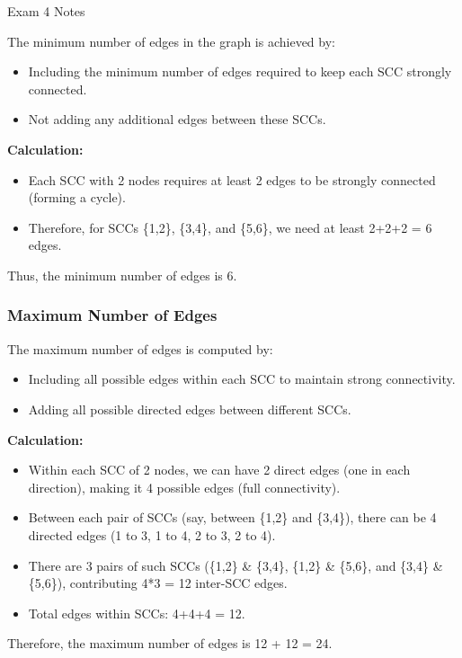 \begin{examnotes}{Exam 4 Notes}
\begin{highlight}
        The minimum number of edges in the graph is achieved by:
        \begin{itemize}
            \item Including the minimum number of edges required to keep each SCC strongly connected.
            \item Not adding any additional edges between these SCCs.
        \end{itemize}
        
        \textbf{Calculation:}
        \begin{itemize}
            \item Each SCC with 2 nodes requires at least 2 edges to be strongly connected (forming a cycle).
            \item Therefore, for SCCs \{1,2\}, \{3,4\}, and \{5,6\}, we need at least 2+2+2 = 6 edges.
        \end{itemize}
        
        Thus, the minimum number of edges is 6.
        
        \subsubsection*{Maximum Number of Edges}
        
        The maximum number of edges is computed by:
        \begin{itemize}
            \item Including all possible edges within each SCC to maintain strong connectivity.
            \item Adding all possible directed edges between different SCCs.
        \end{itemize}
        
        \textbf{Calculation:}
        \begin{itemize}
            \item Within each SCC of 2 nodes, we can have 2 direct edges (one in each direction), making it 4 possible edges (full connectivity).
            \item Between each pair of SCCs (say, between \{1,2\} and \{3,4\}), there can be 4 directed edges (1 to 3, 1 to 4, 2 to 3, 2 to 4).
            \item There are 3 pairs of such SCCs (\{1,2\} \& \{3,4\}, \{1,2\} \& \{5,6\}, and \{3,4\} \& \{5,6\}), contributing 4*3 = 12 inter-SCC edges.
            \item Total edges within SCCs: 4+4+4 = 12.
        \end{itemize}
        
        Therefore, the maximum number of edges is 12 + 12 = 24.
    \end{highlight}
\end{examnotes}

